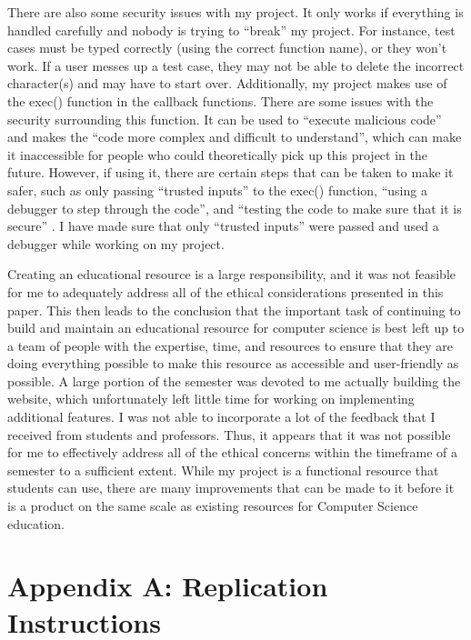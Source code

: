 \documentclass[10pt,twocolumn]{article}
\begin{document}
There are also some security issues with my project. It only works if everything is handled carefully and nobody is trying to \enquote{break} my project. For instance, test cases must be typed correctly (using the correct function name), or they won't work. If a user messes up a test case, they may not be able to delete the incorrect character(s) and may have to start over. Additionally, my project makes use of the exec() function in the callback functions. There are some issues with the security surrounding this function. It can be used to \enquote{execute malicious code} and makes the \enquote{code more complex and difficult to understand}, which can make it inaccessible for people who could theoretically pick up this project in the future. However, if using it, there are certain steps that can be taken to make it safer, such as only passing \enquote{trusted inputs} to the exec() function, \enquote{using a debugger to step through the code}, and \enquote{testing the code to make sure that it is secure} \cite{Exec}. I have  made sure that only \enquote{trusted inputs} were passed and used a debugger while working on my project. 

Creating an educational resource is a large responsibility, and it was not feasible for me to adequately address all of the ethical considerations presented in this paper. This then leads to the conclusion that the important task of continuing to build and maintain an educational resource for computer science is best left up to a team of people with the expertise, time, and resources to ensure that they are doing everything possible to make this resource as accessible and user-friendly as possible. A large portion of the semester was devoted to me actually building the website, which unfortunately left little time for working on implementing additional features. I was not able to incorporate a lot of the feedback that I received from students and professors. Thus, it appears that it was not possible for me to effectively address all of the ethical concerns within the timeframe of a semester to a sufficient extent. While my project is a functional resource that students can use, there are many improvements that can be made to it before it is a product on the same scale as existing resources for Computer Science education.  

\printbibliography

\section{Appendix A: Replication Instructions}
\end{document}

